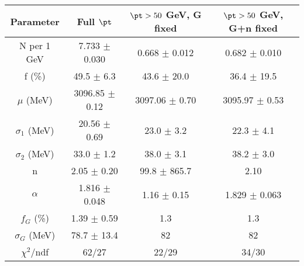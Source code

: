 \begin{tabular}{c||c|c|c}
Parameter & Full $\pt$ & $\pt>50$ GeV, G fixed & $\pt>50$ GeV, G+n fixed \\
\hline
N per 1 GeV & 7.733 $\pm$ 0.030 & 0.668 $\pm$ 0.012 & 0.682 $\pm$ 0.010\\
f (\%) & 49.5 $\pm$ 6.3 & 43.6 $\pm$ 20.0 & 36.4 $\pm$ 19.5\\
$\mu$ (MeV) & 3096.85 $\pm$ 0.12 & 3097.06 $\pm$ 0.70 & 3095.97 $\pm$ 0.53\\
$\sigma_1$ (MeV) & 20.56 $\pm$ 0.69 & 23.0 $\pm$ 3.2 & 22.3 $\pm$ 4.1\\
$\sigma_2$ (MeV) & 33.0 $\pm$ 1.2 & 38.0 $\pm$ 3.1 & 38.2 $\pm$ 3.0\\
n & 2.05 $\pm$ 0.20 & 99.8 $\pm$ 865.7 & 2.10\\
$\alpha$ & 1.816 $\pm$ 0.048 & 1.16 $\pm$ 0.15 & 1.829 $\pm$ 0.063\\
$f_G$ (\%) & 1.39 $\pm$ 0.59 & 1.3 & 1.3\\
$\sigma_G$ (MeV) & 78.7 $\pm$ 13.4 & 82 & 82\\
\hline
$\chi^2$/ndf & 62/27 & 22/29 & 34/30\\
\end{tabular}
